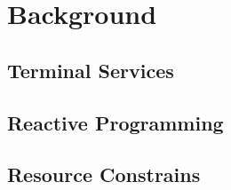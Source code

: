 \chapter{Background}
\label{sec:back}


\section{Terminal Services}


\section{Reactive Programming}


\section{Resource Constrains}